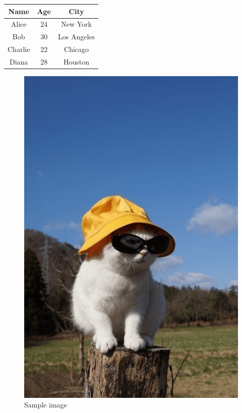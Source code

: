 \documentclass{article}
\begin{document}
\centering
\begin{tabular}{|c|c|c|}
\hline
Name & Age & City \\
\hline \hline
Alice & 24 & New York \\
\hline
Bob & 30 & Los Angeles \\
\hline
Charlie & 22 & Chicago \\
\hline
Diana & 28 & Houston \\
\hline
\end{tabular}

\begin{figure}[h]
\centering
\includegraphics[width=0.7\linewidth]{image.png}
\caption{Sample image}
\label{fig:sample}
\end{figure}
\end{document}
